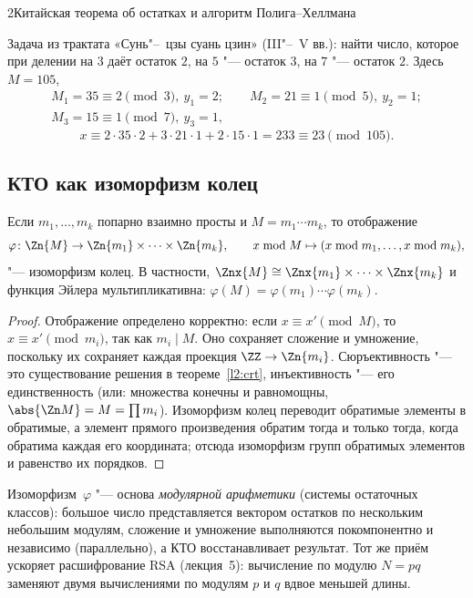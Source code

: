 \begin{lecture}{2}{Китайская теорема об остатках и алгоритм Полига–Хеллмана}
\begin{example}\label{l2:suntzu}
Задача из трактата «Сунь"--~цзы суань цзин» (III"--~V вв.): найти число, которое при делении
на $3$ даёт остаток $2$, на $5$ "--- остаток $3$, на $7$ "--- остаток $2$. Здесь $M = 105$,
\[
\begin{gathered}
  M_1 = 35 \equiv 2 \pmod 3,\ y_1 = 2; \qquad M_2 = 21 \equiv 1 \pmod 5,\ y_2 = 1;\\
  M_3 = 15 \equiv 1 \pmod 7,\ y_3 = 1,
\end{gathered}
\]
\[
  x \equiv 2 \cdot 35 \cdot 2 + 3 \cdot 21 \cdot 1 + 2 \cdot 15 \cdot 1 = 233 \equiv 23 \pmod{105}.
\]
\end{example}


\subsection{КТО как изоморфизм колец}

\begin{theorem}\label{l2:crt-iso}
Если $m_1, \dots, m_k$ попарно взаимно просты и $M = m_1 \cdots m_k$, то отображение
\[
  \varphi\colon \Zn{M} \to \Zn{m_1} \times \cdots \times \Zn{m_k}, \qquad
  x \bmod M \mapsto (x \bmod m_1, \dots, x \bmod m_k),
\]
"--- изоморфизм колец. В частности,
$\Znx{M} \cong \Znx{m_1} \times \cdots \times \Znx{m_k}$ и функция Эйлера мультипликативна:
$\varphi(M) = \varphi(m_1) \cdots \varphi(m_k)$.
\end{theorem}

\begin{proof}
Отображение определено корректно: если $x \equiv x' \pmod M$, то $x \equiv x' \pmod{m_i}$, так как
$m_i \mid M$. Оно сохраняет сложение и умножение, поскольку их сохраняет каждая проекция
$\ZZ \to \Zn{m_i}$. Сюръективность "--- это существование решения в теореме~\ref{l2:crt},
инъективность "--- его единственность (или: множества конечны и равномощны, $\abs{\Zn M} = M =
\prod m_i$). Изоморфизм колец переводит обратимые элементы в обратимые, а элемент прямого
произведения обратим тогда и только тогда, когда обратима каждая его координата; отсюда
изоморфизм групп обратимых элементов и равенство их порядков.
\end{proof}

Изоморфизм~$\varphi$ "--- основа \emph{модулярной арифметики} (системы остаточных классов):
большое число представляется вектором остатков по нескольким небольшим модулям, сложение и
умножение выполняются покомпонентно и независимо (параллельно), а КТО восстанавливает результат.
Тот же приём ускоряет расшифрование RSA (лекция~5): вычисление по модулю $N = pq$ заменяют
двумя вычислениями по модулям $p$ и $q$ вдвое меньшей длины.


\end{lecture}
